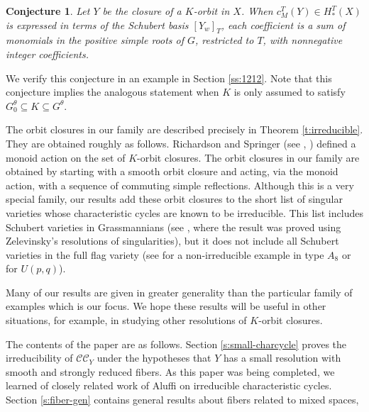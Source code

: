\documentclass[11pt,letterpaper,reqno]{amsart}
\newcommand{\cC}{\mathcal C}
\newcommand{\CC}{\cC \cC}
\numberwithin{equation}{section}
\theoremstyle{plain}
\newtheorem{conjecture}[theorem]{Conjecture}
\theoremstyle{definition}
\theoremstyle{remark}
\begin{document}
\begin{conjecture}\label{conj:positive}
Let $Y$ be the closure of a $K$-orbit in $X$.  When
\(c_M^T(Y) \in H^T_*(X) \) is expressed in terms of the Schubert basis $[Y_w]_T$,
each coefficient is a sum of monomials in the positive simple roots of $G$, restricted to
$T$, with nonnegative integer coefficients.
\end{conjecture}

We verify this conjecture in an example in Section \ref{ss:1212}.  Note that this conjecture
implies the analogous statement when $K$ is only assumed to satisfy $G^{\theta}_0 \subseteq K \subseteq G^{\theta}$.

The orbit closures in our family are described precisely in Theorem \ref{t:irreducible}.  They
are obtained roughly as follows.  Richardson and Springer (see \cite{RS90}, \cite{RS93})
defined a monoid action on the set of $K$-orbit closures.  The orbit closures in our
family are obtained by starting with a smooth orbit closure and acting, via the monoid action,
with a sequence of commuting simple reflections.  Although this is a very special family,
our results add these orbit closures to the short list of singular varieties whose characteristic
cycles are known to be irreducible.  This list includes Schubert varieties in
Grassmannians (see \cite{BresslerFinkelbergLunts1990}, where the result was proved
using Zelevinsky's resolutions of singularities), but it does not include all Schubert
varieties in the full flag variety (see \cite{KS97} for a non-irreducible example in type $A_8$ or \cite{BST2019} for \(U(p,q)\)).

Many of our results are given in greater generality than the particular family of examples
which is our focus.  We hope these results will be useful in other situations, for example, in studying
other resolutions of $K$-orbit closures.



The contents of the paper are as follows.  Section \ref{s:small-charcycle} proves the irreducibility
of $\CC_Y$ under the hypotheses that $Y$ has a small resolution with smooth and strongly
reduced fibers.  As this paper was being completed, we learned of closely related work
of Aluffi \cite{Aluffi2025} on irreducible characteristic cycles.
Section \ref{s:fiber-gen} contains general results about fibers related to mixed spaces,
\end{document}
